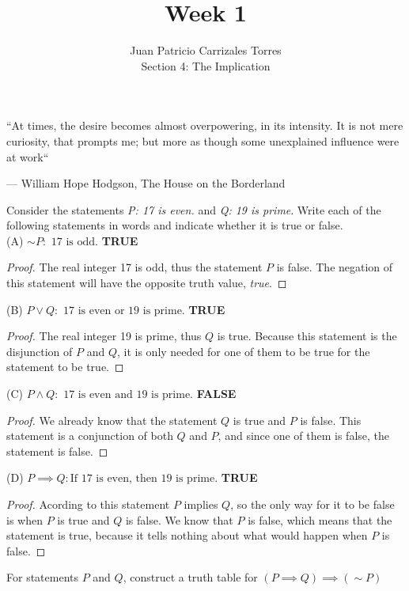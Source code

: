 \documentclass[12pt]{article}
\newenvironment{problem}[2][Problem]{\begin{trivlist}
		\item[\hskip \labelsep {\bfseries #1}\hskip \labelsep {\bfseries #2.}]}{\end{trivlist}}
\begin{document}
	
\title{Week 1}
\author{Juan Patricio Carrizales Torres \\
Section 4: The Implication}

\maketitle
\epigraph{``At times, the desire becomes almost overpowering, in its intensity. It is not mere curiosity, that prompts me; but more as though some unexplained influence were at work``}{--- \textup{William Hope Hodgson}, The House on the Borderland}

\begin{problem}{19}
	Consider the statements \emph{P: 17 is even.} and \emph{Q: 19 is prime}. Write each of the following statements in words and indicate whether it is true or false.\\

(A) $\sim P: \text{ 17 is odd.}$ \textbf{ TRUE}
\begin{proof}
The real integer 17 is odd, thus the statement $P$ is false. The negation of this statement will have the opposite truth value, \emph{true}.
\end{proof}
(B) $P \vee Q: \text{ 17 is even or 19 is prime.}$ \textbf{ TRUE}
\begin{proof}
The real integer 19 is prime, thus $Q$ is true. Because this statement is the disjunction of $P$ and $Q$, it is only needed for one of them to be true for the statement to be true. 
\end{proof}
(C) $P \wedge Q: \text{ 17 is even and 19 is prime.}$ \textbf{ FALSE}
\begin{proof}
	We already know that the statement $Q$ is true and $P$ is false. This statement is a conjunction of both $Q$ and $P$, and since one of them is false, the statement is false.
\end{proof}
(D) $P \implies Q: \text{If 17 is even, then 19 is prime.}$ \textbf{ TRUE}
\begin{proof}
	Acording to this statement $P$ implies $Q$, so the only way for it to be false is when $P$ is true and $Q$ is false. We know that $P$ is false, which means that the statement is true, because it tells nothing about what would happen when $P$ is false. 
\end{proof}
\end{problem}
\newpage
\begin{problem}{20}
For statements $P$ and $Q$, construct a truth table for $(P\implies Q)\implies (\sim P)$ 
\end{problem}
\end{document}
